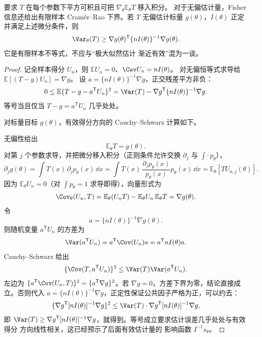 \begin{theorem}
要求 $T$ 在每个参数下平方可积且可把 $\nabla_\theta\mathbb E_\theta T$ 移入积分。
对于无偏估计量，Fisher 信息还给出有限样本 Cramér--Rao 下界。若 $T$ 无偏估计标量 $g(\theta)$，$I(\theta)$ 正定并满足上述微分条件，则
\begin{equation}\label{eq:math-stat-cramer-rao}
 \Var_\theta(T)
 \ge
 \nabla g(\theta)^{\mathsf T}
 \{nI(\theta)\}^{-1}
 \nabla g(\theta).
\end{equation}
它是有限样本不等式，不应与“极大似然估计 渐近有效”混为一谈。
\end{theorem}


\begin{proof}
记全样本得分 $U_n$，则 $\mathbb E U_n=0$、$\Cov U_n=nI(\theta)$。
对无偏恒等式求导给 $\mathbb E[(T-g)U_n]=\nabla g$。
设 $a=\{nI(\theta)\}^{-1}\nabla g$，正交残差平方非负：
\[
 0\le\mathbb E\{T-g-a^{\mathsf T}U_n\}^2
 =\Var(T)-\nabla g^{\mathsf T}\{nI(\theta)\}^{-1}\nabla g.
\]
等号当且仅当 $T-g=a^{\mathsf T}U_n$ 几乎处处。

对标量目标 $g(\theta)$，有效得分方向的 Cauchy--Schwarz 计算如下。

无偏性给出
\[
 \mathbb E_\theta T=g(\theta).
\]
对第 $j$ 个参数求导，并把微分移入积分（正则条件允许交换 $\partial_j$ 与 $\int\cdot\,p_\theta$），
\[
 \partial_j g(\theta)
 =\int T(x)\,\partial_j p_\theta(x)\,\dd x
 =\int T(x)\,\frac{\partial_j p_\theta(x)}{p_\theta(x)}p_\theta(x)\,\dd x
 =\mathbb E_\theta[TU_{n,j}(\theta)].
\]
因为 $\mathbb E_\theta U_n=0$（对 $\int p_\theta=1$ 求导即得），向量形式为
\[
 \Cov_\theta(U_n,T)
 =\mathbb E_\theta(U_n T)-\mathbb E_\theta U_n\,\mathbb E_\theta T
 =\nabla g(\theta).
\]
令
\[
 a=\{nI(\theta)\}^{-1}\nabla g(\theta).
\]
则随机变量 $a^{\mathsf T}U_n$ 的方差为
\[
 \Var(a^{\mathsf T}U_n)
 =a^{\mathsf T}\Cov(U_n)a
 =a^{\mathsf T}nI(\theta)a.
\]
Cauchy--Schwarz 给出
\[
 \{\Cov(T,a^{\mathsf T}U_n)\}^2
 \le\Var(T)\Var(a^{\mathsf T}U_n).
\]
左边为 $\{a^{\mathsf T}\Cov(U_n,T)\}^2=\{a^{\mathsf T}\nabla g\}^2$。若 $\nabla g=0$，方差下界为零，结论直接成立。否则代入 $a=\{nI(\theta)\}^{-1}\nabla g$，正定性保证公共因子严格为正，可以约去：
\[
\{\nabla g^{\mathsf T}[nI(\theta)]^{-1}\nabla g\}^2
\le\Var(T)\cdot\nabla g^{\mathsf T}[nI(\theta)]^{-1}\nabla g,
\]
即 $\Var(T)\ge\nabla g^{\mathsf T}[nI(\theta)]^{-1}\nabla g$，就得到。等号成立要求估计误差几乎处处与有效 得分 方向线性相关，这已经预示了后面有效估计量的 影响函数 $I^{-1}s_\theta$。
\end{proof}

